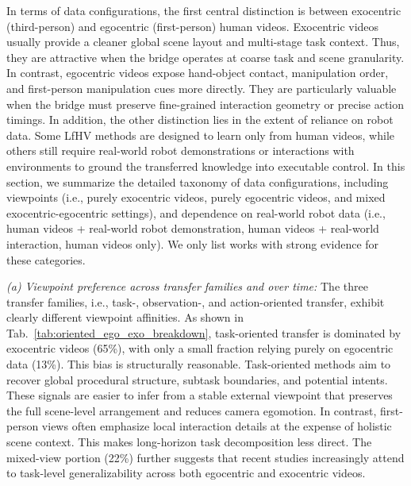 \documentclass[Afour,sageh,times]{sagej}
\begin{document}
In terms of data configurations, the first central distinction is between exocentric (third-person) and egocentric (first-person) human videos. Exocentric videos usually provide a cleaner global scene layout and multi-stage task context. Thus, they are attractive when the bridge operates at coarse task and scene granularity. In contrast, egocentric videos expose hand-object contact, manipulation order, and first-person manipulation cues more directly. They are particularly valuable when the bridge must preserve fine-grained interaction geometry or precise action timings. In addition, the other distinction lies in the extent of reliance on robot data. Some LfHV methods are designed to learn only from human videos, while others still require real-world robot demonstrations or interactions with environments to ground the transferred knowledge into executable control. In this section, we summarize the detailed taxonomy of data configurations, including viewpoints (i.e., purely exocentric videos, purely egocentric videos, and mixed exocentric-egocentric settings), and dependence on real-world robot data (i.e., human videos + real-world robot demonstration, human videos + real-world interaction, human videos only). We only list works with strong evidence for these categories.




\textit{(a) Viewpoint preference across transfer families and over time:} The three transfer families, i.e., task-, observation-, and action-oriented transfer, exhibit clearly different viewpoint affinities. As shown in Tab.~\ref{tab:oriented_ego_exo_breakdown}, task-oriented transfer is dominated by exocentric videos (65\%), with only a small fraction relying purely on egocentric data (13\%). This bias is structurally reasonable. Task-oriented methods aim to recover global procedural structure, subtask boundaries, and potential intents. These signals are easier to infer from a stable external viewpoint that preserves the full scene-level arrangement and reduces camera egomotion. In contrast, first-person views often emphasize local interaction details at the expense of holistic scene context. This makes long-horizon task decomposition less direct. The mixed-view portion (22\%) further suggests that recent studies increasingly attend to task-level generalizability across both egocentric and exocentric videos.
\end{document}
